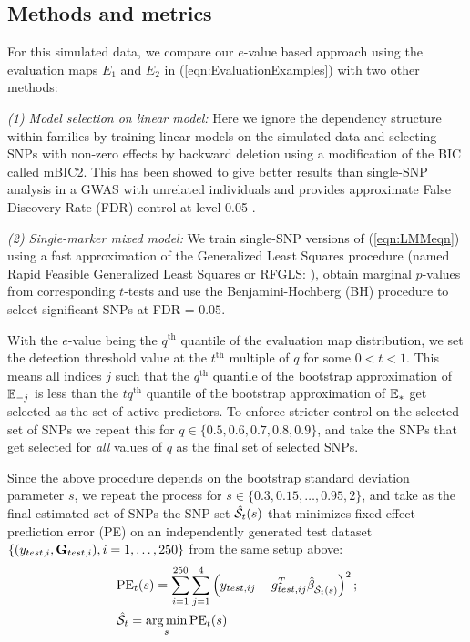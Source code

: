 \subsection{Methods and metrics}
For this simulated data, we compare our $e$-value based approach using the evaluation maps $E_1$ and $E_2$ in (\ref{eqn:EvaluationExamples}) with two other methods:

{\it (1) Model selection on linear model:} Here we ignore the dependency structure within families by training linear models on the simulated data and selecting SNPs with non-zero effects by backward deletion using a modification of the BIC called mBIC2. This has been showed to give better results than single-SNP analysis in a GWAS with unrelated individuals \citep{FrommeletEtal12} and provides approximate False Discovery Rate (FDR) control at level 0.05 \citep{BogdanEtal11}.

{\it (2) Single-marker mixed model:} We train single-SNP versions of (\ref{eqn:LMMeqn}) using a fast approximation of the Generalized Least Squares procedure (named Rapid Feasible Generalized Least Squares or RFGLS: \cite{LiEtal11}), obtain marginal $p$-values from corresponding $t$-tests and use the Benjamini-Hochberg (BH) procedure to select significant SNPs at FDR = $0.05$.

With the $e$-value being the $q^\text{th}$ quantile of the evaluation map distribution, we set the detection threshold value at the $t^\text{th}$ multiple of $q$ for some $0 < t < 1$. This means all indices $j$ such that the $q^\text{th}$ quantile of the bootstrap approximation of $\mathbb{E}_{-j} $ is less than the $tq^\text{th}$ quantile of the bootstrap approximation of $\mathbb{E}_{*}$ get selected as the set of active predictors. To enforce stricter control on the selected set of SNPs we repeat this for $q \in \{ 0.5, 0.6, 0.7, 0.8, 0.9 \}$, and take the SNPs that get selected for \textit{all} values of $q$ as the final set of selected SNPs.

Since the above procedure depends on the bootstrap standard deviation parameter $s$, we repeat the process for $s  \in \{ 0.3, 0.15, \ldots, 0.95, 2 \}$, and take as the final estimated set of SNPs the SNP set $\hat {\mathcal{S}}_t (s)$ that minimizes fixed effect prediction error (PE) on an independently generated test dataset $\{ ({y}_{test,i}, {\mathbf{G}}_{test,i}), i = 1, \ldots, 250 \}$ from the same setup above:
%
\begin{align*}
& \text{PE}_t (s)  = \sum_{i=1}^{250} \sum_{j=1}^4 \left( y_{test,ij} - {g}_{test,ij}^T \hat {{\beta}}_{\hat {\mathcal{S}}_t (s)} \right)^2; \\
& \hat {\mathcal{S}}_t = \operatorname*{arg\,min}_s \text{PE}_t (s)
\end{align*}

